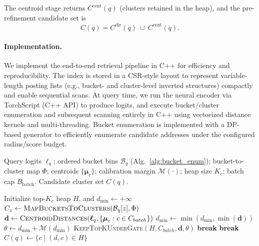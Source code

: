 \documentclass[sigconf, nonacm]{acmart}
\begin{document}
The centroid stage returns $C^{\mathrm{cent}}(q)$ (clusters retained in the heap), and the pre-refinement
candidate set is
\[
C(q) = C^{\mathrm{dir}}(q)\ \cup\ C^{\mathrm{cent}}(q).
\]




\paragraph{Implementation.}
We implement the end-to-end retrieval pipeline in C++ for efficiency and reproducibility. The index is stored in a CSR-style layout to represent variable-length posting lists (e.g., bucket- and cluster-level inverted structures) compactly and enable sequential scans. At query time, we run the neural encoder via TorchScript (C++ API) to produce logits, and execute bucket/cluster enumeration and subsequent scanning entirely in C++ using vectorized distance kernels and multi-threading. Bucket enumeration is implemented with a DP-based generator to efficiently enumerate candidate addresses under the configured radius/score budget.

\begin{algorithm}[t]
\caption{Centroid-Stage Cluster Enumeration with Calibrated Gating}
\label{alg:centroid_enum_gate_simpleB}
\small
\begin{algorithmic}[1]
\Require
Query logits $\boldsymbol{\ell}_q$;
ordered bucket bins $\mathcal{B}_q$ (Alg.~\ref{alg:bucket_enum});
bucket-to-cluster map $\Phi$; centroids $\{\boldsymbol{\mu}_c\}$;
calibration margin $\mathcal{M}(\cdot)$;
heap size $K_c$; batch cap $B_{\text{batch}}$.
\Ensure Candidate cluster set $C(q)$.
 
\State Initialize top-$K_c$ heap $H$, and $d_{\min}\gets+\infty$
    \State $C_z \gets \textsc{MapBucketsToClusters}(\mathcal{B}_q[z], \Phi)$
        \State $\mathbf{d} \gets \textsc{CentroidDistances}(\boldsymbol{\ell}_q,\{\boldsymbol{\mu}_c:c\in C_{batch}\})$
        \State $d_{\min}\gets \min(d_{\min},\min(\mathbf{d}))$
        \State $\theta \gets d_{\min} + \mathcal{M}(d_{\min})$ 
        \State \textsc{KeepTopKUnderGate}$(H, C_{batch}, \mathbf{d}, \theta)$
            \State \textbf{break}
        \EndIf
    \EndFor
        \State \textbf{break}
    \EndIf
\EndFor
\State \Return $C(q)\gets \{c \mid (d,c)\in H\}$
\end{algorithmic}
\end{algorithm}
\end{document}
